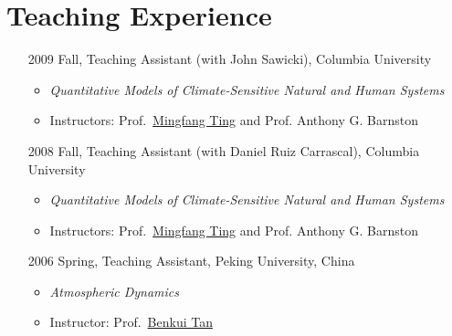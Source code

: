 \documentclass[11pt]{article}
\newcommand{\benkui}{\href{http://www.phy.pku.edu.cn/personnel/das/bktan.xml}{Benkui Tan}}
\newcommand{\mingfang}{\href{http://www.ldeo.columbia.edu/user/ting}{Mingfang Ting}}
\begin{document}
\section{Teaching Experience} 
\begin{itemize}[leftmargin=10ex, itemsep=1ex]
	\item[2009] Fall, Teaching  Assistant (with John Sawicki), Columbia University
	\begin{itemize}[leftmargin=0ex]
		\item \textit{Quantitative Models of Climate-Sensitive Natural and Human Systems}
		\item Instructors: Prof.~\mingfang{} and Prof. Anthony G. Barnston 
		\end{itemize}
		
	\item[2008] Fall, Teaching  Assistant (with Daniel Ruiz Carrascal),  Columbia University
	\begin{itemize}[leftmargin=0ex]
		\item \textit{Quantitative Models of Climate-Sensitive Natural and Human Systems}
		\item Instructors: Prof.~\mingfang{} and Prof. Anthony G. Barnston 
		\end{itemize}
		
	\item[2006] Spring, Teaching  Assistant, Peking University, China
	\begin{itemize}[leftmargin=0ex]
		\item \textit{Atmospheric Dynamics}
		\item Instructor: Prof.~\benkui{}
		\end{itemize}
	\end{itemize}
\end{document}
